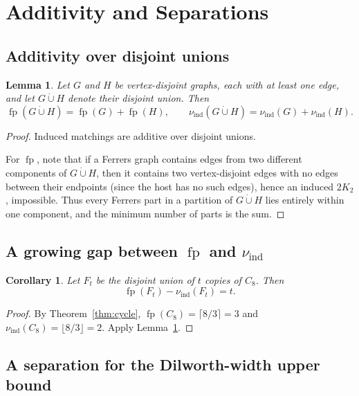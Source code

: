 \documentclass[12pt]{amsart}
\newtheorem{lemma}[theorem]{Lemma}
\newtheorem{corollary}[theorem]{Corollary}
\newcommand{\fp}{\operatorname{fp}}
\newcommand{\ind}{\operatorname{ind}}
\begin{document}
\section{Additivity and Separations}
\label{sec:separations}

\subsection{Additivity over disjoint unions}

\begin{lemma}
\label{lem:additivity}
Let $G$ and $H$ be vertex-disjoint graphs, each with at least one edge, and let $G\dot\cup H$ denote their disjoint union.
Then
\[
\fp(G\dot\cup H)=\fp(G)+\fp(H),
\qquad
\nu_{\ind}(G\dot\cup H)=\nu_{\ind}(G)+\nu_{\ind}(H).
\]
\end{lemma}

\begin{proof}
Induced matchings are additive over disjoint unions.

For $\fp$, note that if a Ferrers graph contains edges from two different components of $G\dot\cup H$, then it contains two vertex-disjoint edges with no edges between their endpoints (since the host has no such edges), hence an induced $2K_2$, impossible.
Thus every Ferrers part in a partition of $G\dot\cup H$ lies entirely within one component, and the minimum number of parts is the sum.
\end{proof}

\subsection{A growing gap between $\fp$ and $\nu_{\ind}$}

\begin{corollary}
\label{cor:gap}
Let $F_t$ be the disjoint union of $t$ copies of $C_8$.
Then
\[
\fp(F_t)-\nu_{\ind}(F_t)=t.
\]
\end{corollary}

\begin{proof}
By Theorem~\ref{thm:cycle}, $\fp(C_8)=\lceil 8/3\rceil=3$ and $\nu_{\ind}(C_8)=\lfloor 8/3\rfloor=2$.
Apply Lemma~\ref{lem:additivity}.
\end{proof}

\subsection{A separation for the Dilworth-width upper bound}
\end{document}
